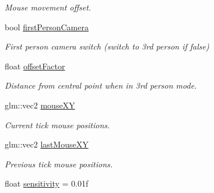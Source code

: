 \begin{DoxyCompactItemize}
\begin{DoxyCompactList}\small\item\em Mouse movement offset. \end{DoxyCompactList}\item 
\hypertarget{class_camera_component_ac1d3fbcc4d2d4a0f079339a238798cd8}{bool \hyperlink{class_camera_component_ac1d3fbcc4d2d4a0f079339a238798cd8}{first\+Person\+Camera}}\label{class_camera_component_ac1d3fbcc4d2d4a0f079339a238798cd8}

\begin{DoxyCompactList}\small\item\em First person camera switch (switch to 3rd person if false) \end{DoxyCompactList}\item 
\hypertarget{class_camera_component_a8d1632f720f6478ceb2c146aee4a35b1}{float \hyperlink{class_camera_component_a8d1632f720f6478ceb2c146aee4a35b1}{offset\+Factor}}\label{class_camera_component_a8d1632f720f6478ceb2c146aee4a35b1}

\begin{DoxyCompactList}\small\item\em Distance from central point when in 3rd person mode. \end{DoxyCompactList}\item 
\hypertarget{class_camera_component_a92d8a306e8b05c1bde2deecb4ae5e1f9}{glm\+::vec2 \hyperlink{class_camera_component_a92d8a306e8b05c1bde2deecb4ae5e1f9}{mouse\+X\+Y}}\label{class_camera_component_a92d8a306e8b05c1bde2deecb4ae5e1f9}

\begin{DoxyCompactList}\small\item\em Current tick mouse positions. \end{DoxyCompactList}\item 
\hypertarget{class_camera_component_aef5b26e5e9b68eab4efec97b74c11b13}{glm\+::vec2 \hyperlink{class_camera_component_aef5b26e5e9b68eab4efec97b74c11b13}{last\+Mouse\+X\+Y}}\label{class_camera_component_aef5b26e5e9b68eab4efec97b74c11b13}

\begin{DoxyCompactList}\small\item\em Previous tick mouse positions. \end{DoxyCompactList}\item 
\hypertarget{class_camera_component_acaa50f9d7c6df9e3c18dad170a1298fc}{float \hyperlink{class_camera_component_acaa50f9d7c6df9e3c18dad170a1298fc}{sensitivity} = 0.\+01f}\label{class_camera_component_acaa50f9d7c6df9e3c18dad170a1298fc}


\end{DoxyCompactItemize}
